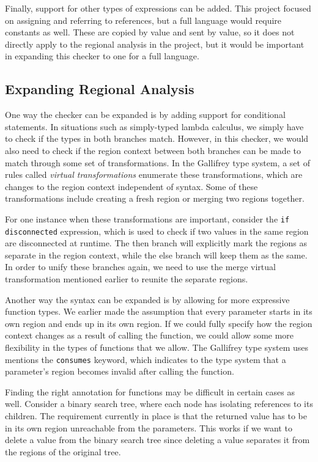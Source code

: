 \documentclass{article}
\begin{document}
  Finally,
    support for other types of expressions can be added.
  This project focused on assigning and referring to references,
    but a full language would require constants as well.
  These are copied by value and sent by value,
    so it does not directly apply to the regional analysis in the project,
    but it would be important in expanding this checker
    to one for a full language.

  \subsection{Expanding Regional Analysis}

  One way the checker can be expanded is by adding support for conditional statements.
  In situations such as simply-typed lambda calculus,
    we simply have to check if the types in both branches match.
  However,
    in this checker,
    we would also need to check if the region context between both branches
    can be made to match through some set of transformations.
  In the Gallifrey type system,
    a set of rules called \textit{virtual transformations} enumerate these transformations,
    which are changes to the region context independent of syntax.
  Some of these transformations include creating a fresh region
    or merging two regions together.

  For one instance when these transformations are important,
    consider the \verb+if disconnected+ expression,
    which is used to check if two values in the same region
    are disconnected at runtime.
  The then branch will explicitly mark the regions as separate in the region context,
    while the else branch will keep them as the same.
  In order to unify these branches again,
    we need to use the merge virtual transformation mentioned earlier
    to reunite the separate regions.

  Another way the syntax can be expanded is by allowing for more expressive function types.
  We earlier made the assumption that every parameter starts in its own region
    and ends up in its own region.
  If we could fully specify how the region context changes as a result of calling the function,
    we could allow some more flexibility in the types of functions that we allow.
  The Gallifrey type system uses mentions the \verb+consumes+ keyword,
    which indicates to the type system that a parameter's region
    becomes invalid after calling the function.

  Finding the right annotation for functions may be difficult in certain cases as well.
  Consider a binary search tree,
    where each node has isolating references to its children.
  The requirement currently in place is that the returned value has to be in its own region
    unreachable from the parameters.
  This works if we want to delete a value from the binary search tree
    since deleting a value separates it from the regions of the original tree.
\end{document}
